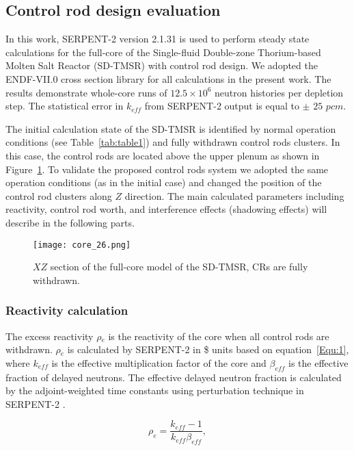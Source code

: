 \subsection{Control rod design evaluation}

In this work, SERPENT-2 version 2.1.31 \cite{leppanen2014serpent} is used to perform steady state calculations for the full-core of the Single-fluid Double-zone Thorium-based Molten Salt Reactor (SD-TMSR) with control rod design. We adopted the ENDF-VII.0 cross section library for all calculations in the present work. The results demonstrate whole-core runs of $12.5\times 10^6$ neutron histories per depletion step. The statistical error in $k_{eff}$ from SERPENT-2 output is equal to $\pm$ $25$ $pcm$.

The initial calculation state of the SD-TMSR is identified by normal operation conditions (see Table~\ref{tab:table1}) and fully withdrawn control rods clusters. In this case, the control rods are located above the upper plenum as shown in Figure~\ref{fig:core_26}. To validate the proposed control rods system we adopted the same operation conditions (as in the initial case) and changed the position of the control rod clusters along $Z$ direction. The main calculated parameters including reactivity, control rod worth, and interference effects (shadowing effects) will describe in the following parts.

\begin{figure}[t!] %
	\centering
	\texttt{[image: core\_26.png]}
	\caption{$XZ$ section of the full-core model of the SD-TMSR, CRs are fully withdrawn.}
	\label{fig:core_26}
\end{figure}

\subsubsection{Reactivity calculation}

The excess reactivity $\rho$$_e$ is the reactivity of the core when all control rods are withdrawn. $\rho$$_e$ is calculated by SERPENT-2 in \$ units based on equation~\ref{Equ:1}, where $k_{eff}$ is the effective multiplication factor of the core and $\beta_{eff}$ is the effective fraction of delayed neutrons. The effective delayed neutron fraction is calculated by the adjoint-weighted time constants using perturbation technique in SERPENT-2 \cite{leppanen2014calculation}.

\begin{equation}
\label{Equ:1}
{{\rho}_{e}}=\dfrac{{k_{eff}}-1}{{k_{eff}}{{\beta}_{eff}}},
\end{equation}

